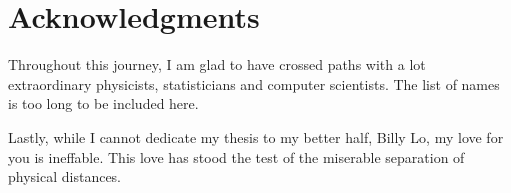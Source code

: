 \section*{Acknowledgments} 


% 
 
 

Throughout this journey, I am glad to have crossed paths with a lot 
extraordinary physicists, statisticians and computer scientists. The list of names
is too long to be included here.

% 

Lastly, while I cannot dedicate my thesis to my better half, Billy Lo,  
my love for you is ineffable. This love has stood the test of the miserable 
separation of physical distances.  
